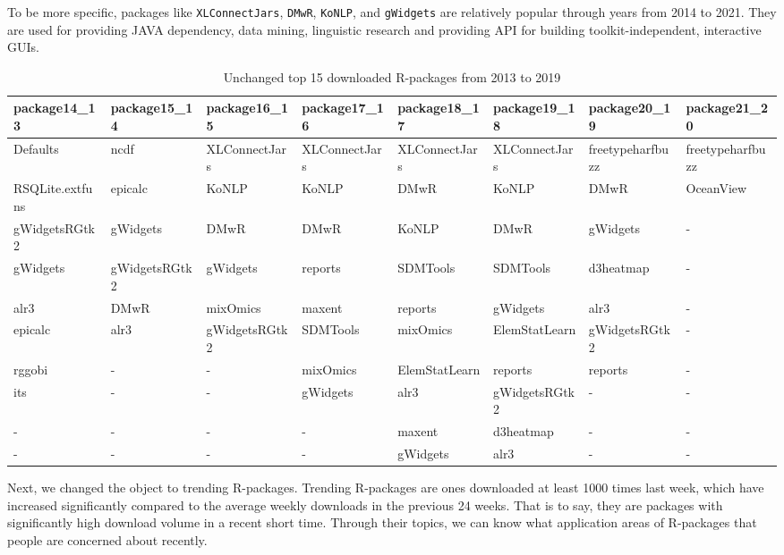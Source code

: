 \documentclass[
]{book}
\begin{document}
To be more specific, packages like \texttt{XLConnectJars}, \texttt{DMwR}, \texttt{KoNLP}, and \texttt{gWidgets} are relatively popular through years from 2014 to 2021. They are used for providing JAVA dependency, data mining, linguistic research and providing API for building toolkit-independent, interactive GUIs.

\begin{table}

\caption{\label{tab:unchanged-top15pkg}Unchanged top 15 downloaded R-packages from 2013 to 2019}
\centering
\begin{tabular}[t]{l|l|l|l|l|l|l|l}
\hline
package14\_13 & package15\_14 & package16\_15 & package17\_16 & package18\_17 & package19\_18 & package20\_19 & package21\_20\\
\hline
Defaults & ncdf & XLConnectJars & XLConnectJars & XLConnectJars & XLConnectJars & freetypeharfbuzz & freetypeharfbuzz\\
\hline
RSQLite.extfuns & epicalc & KoNLP & KoNLP & DMwR & KoNLP & DMwR & OceanView\\
\hline
gWidgetsRGtk2 & gWidgets & DMwR & DMwR & KoNLP & DMwR & gWidgets & -\\
\hline
gWidgets & gWidgetsRGtk2 & gWidgets & reports & SDMTools & SDMTools & d3heatmap & -\\
\hline
alr3 & DMwR & mixOmics & maxent & reports & gWidgets & alr3 & -\\
\hline
epicalc & alr3 & gWidgetsRGtk2 & SDMTools & mixOmics & ElemStatLearn & gWidgetsRGtk2 & -\\
\hline
rggobi & - & - & mixOmics & ElemStatLearn & reports & reports & -\\
\hline
its & - & - & gWidgets & alr3 & gWidgetsRGtk2 & - & -\\
\hline
- & - & - & - & maxent & d3heatmap & - & -\\
\hline
- & - & - & - & gWidgets & alr3 & - & -\\
\hline
\end{tabular}
\end{table}

Next, we changed the object to trending R-packages. Trending R-packages are ones downloaded at least 1000 times last week, which have increased significantly compared to the average weekly downloads in the previous 24 weeks\autocite{r-hub}. That is to say, they are packages with significantly high download volume in a recent short time. Through their topics, we can know what application areas of R-packages that people are concerned about recently.
\end{document}
